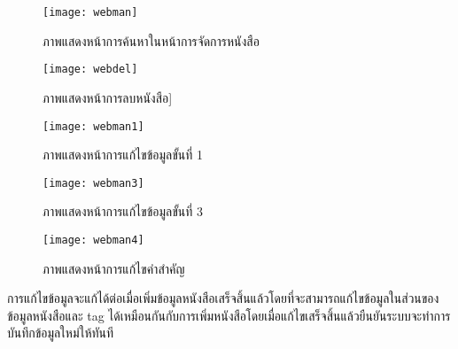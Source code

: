 \begin{figure}[H]
    \centering
    \texttt{[image: webman]}
    \caption{ภาพแสดงหน้าการค้นหาในหน้าการจัดการหนังสือ}\label{fig:webman}
\end{figure}

\begin{figure}[H]
    \centering
    \texttt{[image: webdel]}
    \caption{ภาพแสดงหน้าการลบหนังสือ]}\label{fig:webdel}
\end{figure}

\begin{figure}[H]
    \centering
    \texttt{[image: webman1]}
    \caption{ภาพแสดงหน้าการแก้ไขข้อมูลขั้นที่ 1}\label{fig:webman1}
\end{figure}

\begin{figure}[H]
    \centering
    \texttt{[image: webman3]}
    \caption{ภาพแสดงหน้าการแก้ไขข้อมูลขั้นที่ 3}\label{fig:webman2}
\end{figure}

\begin{figure}[H]
    \centering
    \texttt{[image: webman4]}
    \caption{ภาพแสดงหน้าการแก้ไขคำสำคัญ}\label{fig:webman4}
\end{figure}

การแก้ไขข้อมูลจะแก้ได้ต่อเมื่อเพิ่มข้อมูลหนังสือเสร็จสิ้นแล้วโดยที่จะสามารถแก้ไขข้อมูลในส่วนของข้อมูลหนังสือและ tag ได้เหมือนกันกับการเพิ่มหนังสือโดยเมื่อแก้ไขเสร็จสิ้นแล้วยืนยันระบบจะทำการบันทึกข้อมูลใหม่ให้ทันที
